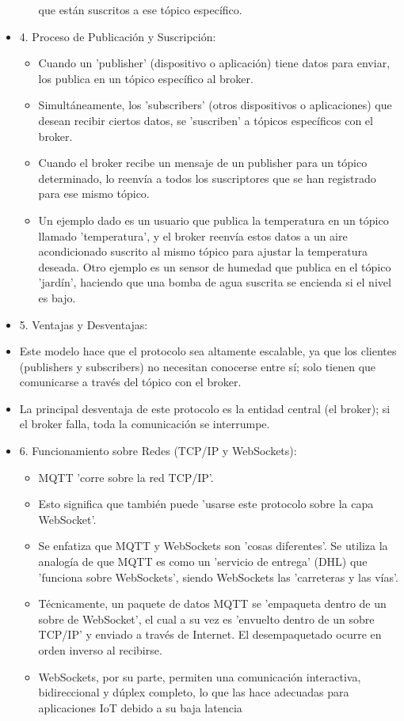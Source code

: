 \documentclass{report}
\begin{document}
\begin{itemize}
\begin{itemize}
            que están suscritos a ese tópico específico.
        \end{itemize}
    \item 4. Proceso de Publicación y Suscripción:
        \begin{itemize}
            \item Cuando un 'publisher' (dispositivo o aplicación) tiene datos para enviar, los publica en un tópico específico al broker.
            \item Simultáneamente, los 'subscribers' (otros dispositivos o aplicaciones) que desean recibir ciertos datos, se 'suscriben' 
            a tópicos específicos con el broker.
            \item Cuando el broker recibe un mensaje de un publisher para un tópico determinado, lo reenvía a todos los suscriptores que 
            se han registrado para ese mismo tópico.
            \item Un ejemplo dado es un usuario que publica la temperatura en un tópico llamado 'temperatura', y el broker 
            reenvía estos datos a un aire acondicionado suscrito al mismo tópico para ajustar la temperatura deseada. Otro ejemplo es un 
            sensor de humedad que publica en el tópico 'jardín', haciendo que una bomba de agua suscrita se encienda si el nivel es bajo.
        \end{itemize}
    \item 5. Ventajas y Desventajas:
            \item Este modelo hace que el protocolo sea altamente escalable, ya que los clientes (publishers y subscribers) no 
            necesitan conocerse entre sí; solo tienen que comunicarse a través del tópico con el broker.
            \item La principal desventaja de este protocolo es la entidad central (el broker); si el broker falla, toda la 
            comunicación se interrumpe.
    \item 6. Funcionamiento sobre Redes (TCP/IP y WebSockets):
        \begin{itemize}
            \item MQTT 'corre sobre la red TCP/IP'.
            \item Esto significa que también puede 'usarse este protocolo sobre la capa WebSocket'.
            \item Se enfatiza que MQTT y WebSockets son 'cosas diferentes'. Se utiliza la analogía de que MQTT es como un 
            'servicio de entrega' (DHL) que 'funciona sobre WebSockets', siendo WebSockets las 'carreteras y las vías'.
            \item Técnicamente, un paquete de datos MQTT se 'empaqueta dentro de un sobre de WebSocket', el cual a su vez es 
            'envuelto dentro de un sobre TCP/IP' y enviado a través de Internet. El desempaquetado ocurre en orden inverso al recibirse.
            \item WebSockets, por su parte, permiten una comunicación interactiva, bidireccional y dúplex completo, lo que las hace 
            adecuadas para aplicaciones IoT debido a su baja latencia
        \end{itemize}
\end{itemize}
\end{document}
